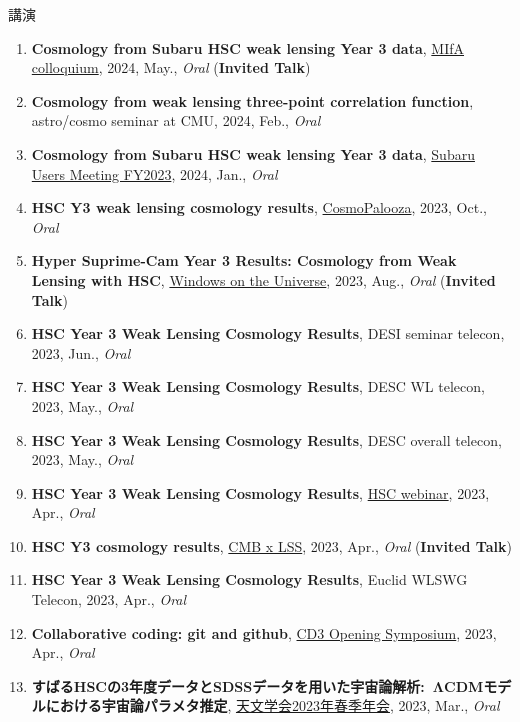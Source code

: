 \begin{rSection}{講演}
\begin{enumerate}
\item \textbf{Cosmology from Subaru HSC weak lensing Year 3 data}, \href{https://cse.umn.edu/physics/minnesota-institute-astrophysics-mifa-colloquium}{MIfA colloquium}, 2024, May., \textit{Oral} (\textbf{Invited Talk})
\item \textbf{Cosmology from weak lensing three-point correlation function}, astro/cosmo seminar at CMU, 2024, Feb., \textit{Oral}
\item \textbf{Cosmology from Subaru HSC weak lensing Year 3 data}, \href{https://www.subarutelescope.org/Science/SubaruUM/SubaruUM2023/index.html}{Subaru Users Meeting FY2023}, 2024, Jan., \textit{Oral}
\item \textbf{HSC Y3 weak lensing cosmology results}, \href{http://vietnam.in2p3.fr/2023/windows/index.html}{CosmoPalooza}, 2023, Oct., \textit{Oral}
\item \textbf{Hyper Suprime-Cam Year 3 Results: Cosmology from Weak Lensing with HSC}, \href{http://vietnam.in2p3.fr/2023/windows/index.html}{Windows on the Universe}, 2023, Aug., \textit{Oral} (\textbf{Invited Talk})
\item \textbf{HSC Year 3 Weak Lensing Cosmology Results}, DESI seminar telecon, 2023, Jun., \textit{Oral}
\item \textbf{HSC Year 3 Weak Lensing Cosmology Results}, DESC WL telecon, 2023, May., \textit{Oral}
\item \textbf{HSC Year 3 Weak Lensing Cosmology Results}, DESC overall telecon, 2023, May., \textit{Oral}
\item \textbf{HSC Year 3 Weak Lensing Cosmology Results}, \href{https://hsc-release.mtk.nao.ac.jp/doc/index.php/wly3/}{HSC webinar}, 2023, Apr., \textit{Oral}
\item \textbf{HSC Y3 cosmology results}, \href{https://www2.yukawa.kyoto-u.ac.jp/~cmb-lss/index.php}{CMB x LSS}, 2023, Apr., \textit{Oral} (\textbf{Invited Talk})
\item \textbf{HSC Year 3 Weak Lensing Cosmology Results}, Euclid WLSWG Telecon, 2023, Apr., \textit{Oral}
\item \textbf{Collaborative coding: git and github}, \href{https://cd3.ipmu.jp/opening/}{CD3 Opening Symposium}, 2023, Apr., \textit{Oral}
\item \textbf{すばるHSCの3年度データとSDSSデータを用いた宇宙論解析: ΛCDMモデルにおける宇宙論パラメタ推定}, \href{https://www.asj.or.jp/nenkai/archive/2023a/pdf/U20a.pdf}{天文学会2023年春季年会}, 2023, Mar., \textit{Oral}

\end{enumerate}
\end{rSection}
